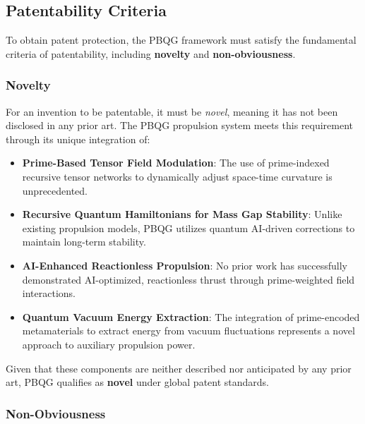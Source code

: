 \documentclass{article}
\theoremstyle{plain}
\begin{document}
\subsection{Patentability Criteria}
\label{subsec:patentability}

To obtain patent protection, the PBQG framework must satisfy the fundamental criteria of patentability, including \textbf{novelty} and \textbf{non-obviousness}.

\subsubsection{Novelty}
\label{subsubsec:novelty}

For an invention to be patentable, it must be \textit{novel}, meaning it has not been disclosed in any prior art. The PBQG propulsion system meets this requirement through its unique integration of:
\begin{itemize}
    \item \textbf{Prime-Based Tensor Field Modulation}: The use of prime-indexed recursive tensor networks to dynamically adjust space-time curvature is unprecedented.
    \item \textbf{Recursive Quantum Hamiltonians for Mass Gap Stability}: Unlike existing propulsion models, PBQG utilizes quantum AI-driven corrections to maintain long-term stability.
    \item \textbf{AI-Enhanced Reactionless Propulsion}: No prior work has successfully demonstrated AI-optimized, reactionless thrust through prime-weighted field interactions.
    \item \textbf{Quantum Vacuum Energy Extraction}: The integration of prime-encoded metamaterials to extract energy from vacuum fluctuations represents a novel approach to auxiliary propulsion power.
\end{itemize}

Given that these components are neither described nor anticipated by any prior art, PBQG qualifies as \textbf{novel} under global patent standards.

\subsubsection{Non-Obviousness}
\label{subsubsec:non_obviousness}
\end{document}
